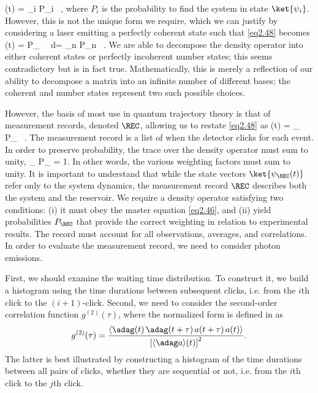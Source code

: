 %
\be \rho(t) = \sum_i P_i \,  , \label{eq2.48} \ee
%
where $P_i$ is the probability to find the system in state $\ket{\psi_i}$. However, this is not the unique form we require, which we can justify by considering a laser emitting a perfectly coherent state such that \eqref{eq2.48} becomes
%
\be \rho(t) = \int P_{\alpha} \, \ket{\psi_{\alpha}} \bra{\psi_{\alpha}} \, d\alpha = \sum_n P_n \,  . \label{eq2.49} \ee
%
We are able to decompose the density operator into either coherent states or perfectly incoherent number states; this seems contradictory but is in fact true. Mathematically, this is merely a reflection of our ability to decompose a matrix into an infinite number of different bases; the coherent and number states represent two such possible choices.

However, the basis of most use in quantum trajectory theory is that of measurement records, denoted $\REC$, allowing us to restate \eqref{eq2.48} as
%
\be \rho(t) = \sum_{\REC} P_{\REC} \, \ket{\psi_{\REC}} \bra{\psi_{\REC}}. \label{eq2.50} \ee
%
The measurement record is a list of when the detector clicks for each event. In order to preserve probability, the trace over the density operator must sum to unity,
%
\be \sum_{\REC} P_{\REC} = 1. \label{eq2.51} \ee
%
In other words, the various weighting factors must sum to unity. It is important to understand that while the state vectors $\ket{\psi_{\REC}(t)}$ refer only to the system dynamics, the measurement record $\REC$ describes both the system and the reservoir. We require a density operator satisfying two conditions: (i) it must obey the master equation \eqref{eq2.46}, and (ii) yield probabilities $P_{\REC}$ that provide the correct weighting in relation to experimental results. The record must account for all observations, averages, and correlations. In order to evaluate the measurement record, we need to consider photon emissions.

First, we should examine the waiting time distribution. To construct it, we build a histogram using the time durations between subsequent clicks, i.e. from the $i$th click to the $(i + 1)$-click. Second, we need to consider the second-order correlation function $g^{(2)}(\tau)$, where the normalized form is defined in \cite{howard1} as
%
\[ g^{(2)}(\tau) = \frac{\langle \adag(t) \, \adag(t + \tau) \, a(t + \tau) \, a(t) \rangle}{ \left[ \langle \adag a \rangle(t) \right]^2}. \] 
%
The latter is best illustrated by constructing a histogram of the time durations between all pairs of clicks, whether they are sequential or not, i.e. from the $i$th click to the $j$th click.

